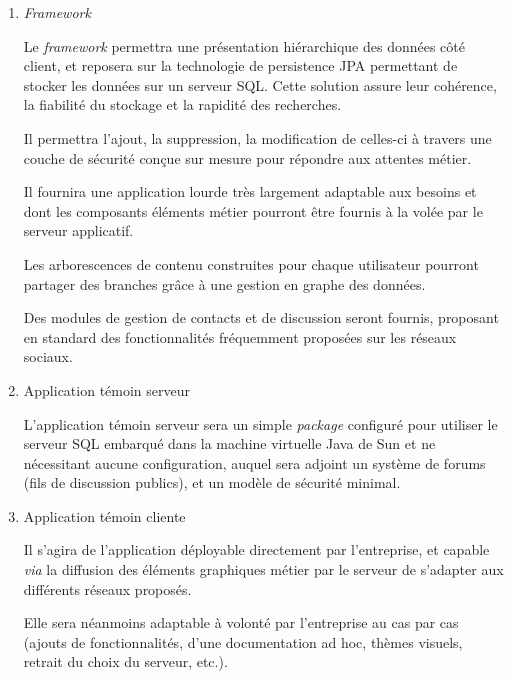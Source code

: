 \begin{enumerate}

 \item \textit{Framework}

Le \textit{framework} permettra une présentation hiérarchique des données côté client, et reposera sur la technologie de persistence JPA permettant de stocker les données sur un serveur SQL. Cette solution assure leur cohérence, la fiabilité du stockage et la rapidité des recherches.

Il permettra l'ajout, la suppression, la modification de celles-ci à travers une couche de sécurité conçue sur mesure pour répondre aux attentes métier.

Il fournira une application lourde très largement adaptable aux besoins et dont les composants éléments métier pourront être fournis à la volée par le serveur applicatif.

Les arborescences de contenu construites pour chaque utilisateur pourront partager des branches grâce à une gestion en graphe des données.

Des modules de gestion de contacts et de discussion seront fournis, proposant en standard des fonctionnalités fréquemment proposées sur les réseaux sociaux.

 \item Application témoin serveur

L'application témoin serveur sera un simple \emph{package} configuré pour utiliser le serveur SQL embarqué dans la machine virtuelle Java de Sun et ne nécessitant aucune configuration, auquel sera adjoint un système de forums (fils de discussion publics), et un modèle de sécurité minimal.

 \item Application témoin cliente

Il s'agira de l'application déployable directement par l'entreprise, et capable \emph{via} la diffusion des éléments graphiques métier par le serveur de s'adapter aux différents réseaux proposés.

Elle sera néanmoins adaptable à volonté par l'entreprise au cas par cas (ajouts de fonctionnalités, d'une documentation ad hoc, thèmes visuels, retrait du choix du serveur, etc.).

\end{enumerate}